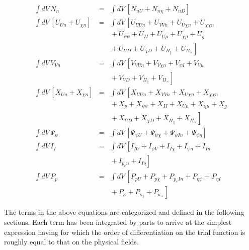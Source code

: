 \documentclass[letterpaper]{book}
\newcommand{\tensor}[1]{\mathsf{#1}}
\renewcommand{\P}{\tensor{\Pi}}
\begin{document}
\begin{subequations}
  \label{eq:equations_ibp}
\begin{eqnarray}
  \int dV\, N_n & = & \int dV\, \left[
    N_{n U} + N_{n \chi} + N_{n D} \right]
  \\
  \int dV\, \left[U_{U n} + U_{\chi n}\right] & = & \int dV\, 
  \left[ 
    U_{U U n} + U_{V V n} + U_{U \chi n} + U_{\chi \chi n} 
    \right. \\ && \nonumber \left. \mbox{} 
    + U_{\psi \psi} + U_{I I} + U_{U \mu} + U_{\chi \mu} + U_g
    \right. \\ && \nonumber \left. \mbox{} 
    + U_{U D} + U_{\chi D} + U_{\P_\parallel} + U_{\P_\times}
    \right]
  \\
  \int dV\, V_{V n} & = & \int dV\, \left[
    V_{V U n} + V_{V \chi n} + V_{\psi I} + V_{V \mu} 
    \right. \\ && \nonumber \left. \mbox{} + V_{V D}  
    + V_{\P_\parallel} + V_{\P_\times} \right]
  \\
  \int dV\, \left[X_{U n} + X_{\chi n}\right] & = & \int dV\, \left[
    X_{U U n}+ X_{V V n}+ X_{U \chi n}+ X_{\chi \chi n} 
    \right.\\  && \nonumber \left. \mbox{} 
    + X_p + X_{\psi \psi} + X_{I I} + X_{U \mu} + X_{\chi \mu} + X_g 
    \right. \\ && \nonumber \left. \mbox{} 
    + X_{U D} + X_{\chi D} + X_{\P_\parallel} + X_{\P_\times}
    \right]
  \\
  \int dV\, \Psi_\psi & = & \int dV\, \left[
    \Psi_{\psi U} + \Psi_{\psi \chi} + \Psi_{\psi I n}
    + \Psi_{\psi \eta} \right]
  \\
  \int dV\, I_I & = & \int dV\, \left[
    I_{I U} + I_{\psi V} + I_{I \chi} + I_{\psi n} + I_{I n} 
    \right. \\ && \nonumber \left. \mbox{} + I_{p_e n} + I_{I \eta} \right]
  \\
  \int dV\, P_p & = & \int dV\, \left[
    P_{p U} + P_{p \chi} + P_{p_e I n} + P_{\eta \psi} + P_{\eta I} 
    \right. \\ && \nonumber \left. \mbox{} 
    + P_\kappa + P_{\kappa_\parallel} + P_{\kappa_\times} \right]
\end{eqnarray}
\end{subequations}

The terms in the above equations are categorized and defined in the
following sections.  Each term has been integrated by parts to arrive
at the simplest expression having for which the order of
differentiation on the trial function is roughly equal to that on the
physical fields.
\end{document}
